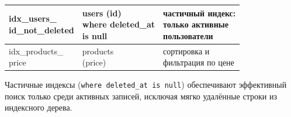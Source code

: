 \begin{table}[H]
\begin{tabular}{|l|l|l|}
        \makecell[l]{idx\_users\_\\id\_not\_deleted} & \makecell[l]{users (id)\\where deleted\_at\\is null} & \makecell[l]{частичный индекс:\\только активные\\пользователи} \\ \hline
        \makecell[l]{idx\_products\_\\price} & \makecell[l]{products\\(price)} & \makecell[l]{сортировка и\\фильтрация по цене} \\ \hline
    \end{tabular}
\end{table}

Частичные индексы (\texttt{where deleted\_at is null}) обеспечивают эффективный поиск только среди активных записей, исключая мягко удалённые строки из индексного дерева.

\clearpage

